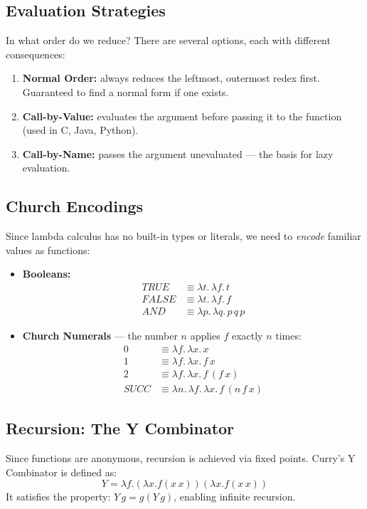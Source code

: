 \subsection{Evaluation Strategies}
In what order do we reduce? There are several options, each with different
consequences:

\begin{enumerate}
    \item \textbf{Normal Order:} always reduces the leftmost, outermost redex
    first. Guaranteed to find a normal form if one exists.
    \item \textbf{Call-by-Value:} evaluates the argument before passing it
    to the function (used in C, Java, Python).
    \item \textbf{Call-by-Name:} passes the argument unevaluated — the basis
    for lazy evaluation.
\end{enumerate}

\subsection{Church Encodings}
Since lambda calculus has no built-in types or literals, we need to
\emph{encode} familiar values as functions:

\begin{itemize}
    \item \textbf{Booleans:}
    \begin{align*}
        \mathit{TRUE}  &\equiv \lambda t.\, \lambda f.\, t \\
        \mathit{FALSE} &\equiv \lambda t.\, \lambda f.\, f \\
        \mathit{AND}   &\equiv \lambda p.\, \lambda q.\, p\, q\, p
    \end{align*}
    \item \textbf{Church Numerals} — the number $n$ applies $f$ exactly
    $n$ times:
    \begin{align*}
        0    &\equiv \lambda f.\, \lambda x.\, x \\
        1    &\equiv \lambda f.\, \lambda x.\, f\, x \\
        2    &\equiv \lambda f.\, \lambda x.\, f\,(f\, x) \\
        \mathit{SUCC} &\equiv \lambda n.\, \lambda f.\, \lambda x.\,
                               f\,(n\, f\, x)
    \end{align*}
\end{itemize}

\subsection{Recursion: The Y Combinator}
Since functions are anonymous, recursion is achieved via fixed points. Curry's Y Combinator is defined as:
\[ Y = \lambda f. (\lambda x. f (x \, x)) (\lambda x. f (x \, x)) \]
It satisfies the property: $Y \, g = g (Y \, g)$, enabling infinite recursion.

